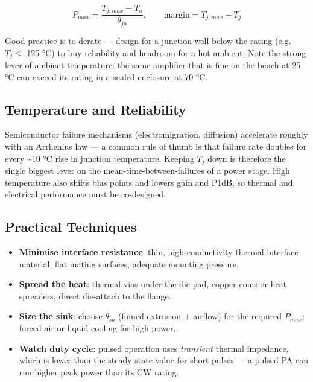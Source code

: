       
\[P_{max} = \dfrac{T_{j,max}-T_a}{\theta_{ja}},\qquad \text{margin} = T_{j,max}-T_j\]

      

Good practice is to derate — design for a junction well below the rating (e.g. $T_j\le$ 125 °C) to buy reliability and headroom for a hot ambient. Note the strong lever of ambient temperature: the same amplifier that is fine on the bench at 25 °C can exceed its rating in a sealed enclosure at 70 °C.

      

\subsection{Temperature and Reliability}

      

Semiconductor failure mechanisms (electromigration, diffusion) accelerate roughly with an Arrhenius law — a common rule of thumb is that failure rate doubles for every \textasciitilde{}10 °C rise in junction temperature. Keeping $T_j$ down is therefore the single biggest lever on the mean-time-between-failures of a power stage. High temperature also shifts bias points and lowers gain and P1dB, so thermal and electrical performance must be co-designed.

      

\subsection{Practical Techniques}

      
\begin{itemize}

        \item \textbf{Minimise interface resistance}: thin, high-conductivity thermal interface material, flat mating surfaces, adequate mounting pressure.

        \item \textbf{Spread the heat}: thermal vias under the die pad, copper coins or heat spreaders, direct die-attach to the flange.

        \item \textbf{Size the sink}: choose $\theta_{sa}$ (finned extrusion + airflow) for the required $P_{max}$; forced air or liquid cooling for high power.

        \item \textbf{Watch duty cycle}: pulsed operation uses \emph{transient} thermal impedance, which is lower than the steady-state value for short pulses — a pulsed PA can run higher peak power than its CW rating.

      
\end{itemize}



